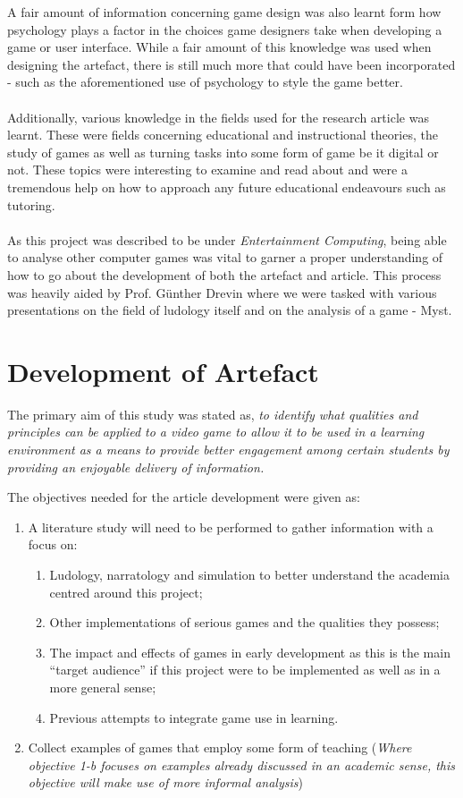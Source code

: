 A fair amount of information concerning game design was also learnt form how psychology plays a factor in the choices game designers take when developing a game or user interface. While a fair amount of this knowledge was used when designing the artefact, there is still much more that could have been incorporated - such as the aforementioned use of psychology to style the game better.
\\\\
Additionally, various knowledge in the fields used for the research article was learnt. These were fields concerning educational and instructional theories, the study of games as well as turning tasks into some form of game be it digital or not. These topics were interesting to examine and read about and were a tremendous help on how to approach any future educational endeavours such as tutoring. 
\\\\
As this project was described to be under \textit{Entertainment Computing}, being able to analyse other computer games was vital to garner a proper understanding of how to go about the development of both the artefact and article. This process was heavily aided by Prof. Günther Drevin where we were tasked with various presentations on the field of ludology itself and on the analysis of a game - Myst.

\section{Development of Artefact}
The primary aim of this study was stated as, \textit{to identify what qualities and principles can be applied to a video game to allow it to be used in a learning environment as a means to provide better engagement among certain students by providing an enjoyable delivery of information.}

The objectives needed for the article development were given as:
\begin{enumerate}
\item A literature study will need to be performed to gather information with a focus on:
\begin{enumerate}
\item Ludology, narratology and simulation to better understand the academia centred around this project;
\item Other implementations of serious games and the qualities they possess;
\item The impact and effects of games in early development as this is the main “target audience” if this project were to be implemented as well as in a more general sense;
\item Previous attempts to integrate game use in learning.
\end{enumerate}
\item Collect examples of games that employ some form of teaching 
(\textit{Where objective 1-b focuses on examples already discussed in an academic sense, this objective will make use of more informal analysis})
\end{enumerate}

